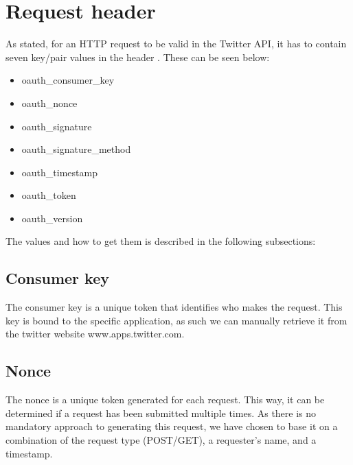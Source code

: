\section{Request header}
As stated, for an \ac{HTTP} request to be valid in the Twitter API, it has to
contain seven key/pair values in the header \citep{TwitterAPIAuth}. These can
be seen below:

\begin{itemize}
  \item oauth\_consumer\_key
  \item oauth\_nonce
  \item oauth\_signature
  \item oauth\_signature\_method
  \item oauth\_timestamp
  \item oauth\_token
  \item oauth\_version
\end{itemize}

The values and how to get them is described in the following subsections:

\subsection*{Consumer key}
The consumer key is a unique token that identifies who makes the request.
This key is bound to the specific application, as such we can manually retrieve
it from the twitter website www.apps.twitter.com.

\subsection*{Nonce}
The nonce is a unique token generated for each request. This way, it can be
determined if a request has been submitted multiple times. As there is no
mandatory approach to generating this request, we have chosen to base it on a
combination of the request type (POST/GET), a requester's name, and a timestamp.

